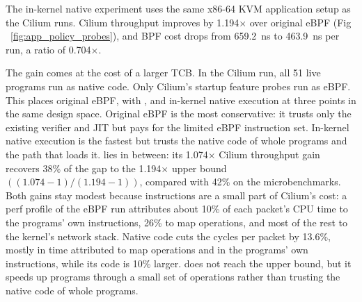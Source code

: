 The in-kernel native experiment uses the same x86-64 KVM application setup as the Cilium \lang runs.
Cilium throughput improves by 1.194$\times$ over original eBPF (Fig ~\ref{fig:app_policy_probes}), and BPF cost drops from 659.2~ns to 463.9~ns per run, a ratio of 0.704$\times$.

The gain comes at the cost of a larger TCB.
In the Cilium run, all 51 live programs run as native code. Only Cilium's startup feature probes run as eBPF.
This places original eBPF, \tool with \lang, and in-kernel native execution at three points in the same design space.
Original eBPF is the most conservative: it trusts only the existing verifier and JIT but pays for the limited eBPF instruction set.
In-kernel native execution is the fastest but trusts the native code of whole programs and the path that loads it.
\lang lies in between: its 1.074$\times$ Cilium throughput gain recovers 38\% of the gap to the 1.194$\times$ upper bound $((1.074{-}1)/(1.194{-}1))$, compared with 42\% on the microbenchmarks. Both gains stay modest because instructions are a small part of Cilium's cost: a perf profile of the eBPF run attributes about 10\% of each packet's CPU time to the programs' own instructions, 26\% to map operations, and most of the rest to the kernel's network stack. Native code cuts the cycles per packet by 13.6\%, mostly in time attributed to map operations and in the programs' own instructions, while its code is 10\% larger.
\lang does not reach the upper bound, but it speeds up programs through a small set of \lang operations rather than trusting the native code of whole programs.
